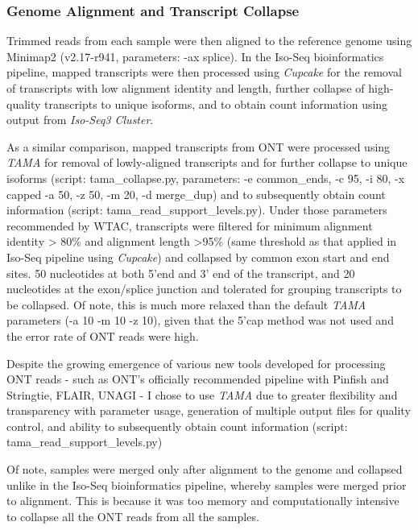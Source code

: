 \subsubsection{Genome Alignment and Transcript Collapse}
Trimmed reads from each sample were then aligned to the reference genome using Minimap2 \cite{Li2018} (v2.17-r941, parameters: -ax splice). In the Iso-Seq bioinformatics pipeline, mapped transcripts were then processed using \textit{Cupcake} for the removal of transcripts with low alignment identity and length, further collapse of high-quality transcripts to unique isoforms, and to obtain count information using output from \textit{Iso-Seq3 Cluster}.

As a similar comparison, mapped transcripts from ONT were processed using \textit{TAMA} for removal of lowly-aligned transcripts and for further collapse to unique isoforms (script: tama\_collapse.py, parameters: -e common\_ends, -c 95, -i 80, -x capped -a 50, -z 50, -m 20, -d merge\_dup) and to subsequently obtain count information (script: tama\_read\_support\_levels.py). Under those parameters recommended by WTAC, transcripts were filtered for minimum alignment identity > 80\% and alignment length >95\% (same threshold as that applied in Iso-Seq pipeline using \textit{Cupcake}) and collapsed by common exon start and end sites. 50 nucleotides at both 5'end and 3' end of the transcript, and 20 nucleotides at the exon/splice junction and tolerated for grouping transcripts to be collapsed. Of note, this is much more relaxed than the default \textit{TAMA} parameters (-a 10 -m 10 -z 10), given that the 5'cap method was not used and the error rate of ONT reads were high. 

Despite the growing emergence of various new tools developed for processing ONT reads - such as ONT's officially recommended pipeline with Pinfish and Stringtie, FLAIR, UNAGI - I chose to use \textit{TAMA} due to greater flexibility and transparency with parameter usage, generation of multiple output files for quality control, and ability to subsequently obtain count information (script: tama\_read\_support\_levels.py)

Of note, samples were merged only after alignment to the genome and collapsed unlike in the Iso-Seq bioinformatics pipeline, whereby samples were merged prior to alignment. This is because it was too memory and computationally intensive to collapse all the ONT reads from all the samples. 

